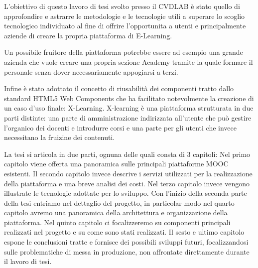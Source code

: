 L'obiettivo di questo lavoro di tesi svolto presso il CVDLAB è stato quello di approfondire e astrarre le metodologie e le tecnologie utili a superare lo scoglio tecnologico individuato al fine di offrire l'opportunita a utenti e principalmente aziende di creare la propria piattaforma di E-Learning.

Un possibile fruitore della piattaforma potrebbe essere ad esempio una grande azienda che vuole creare una propria sezione Academy tramite la quale formare il personale senza dover necessariamente appogiarsi a terzi. 

Infine è stato adottato il concetto di riusabilità dei componenti tratto dallo standard HTML5 Web Components che ha facilitato notevolmente la creazione di un caso d'uso finale: X-Learning.
X-learning è una piattaforma strutturata in due parti distinte: una parte di amministrazione indirizzata all'utente che può gestire l'organico dei docenti e introdurre corsi e una parte per gli utenti che invece necessitano la fruizine dei contenuti.

La tesi si articola in due parti, ognuna delle quali consta di 3 capitoli:
Nel primo capitolo viene offerta una panoramica sulle principali piattaforme MOOC esistenti.
Il secondo capitolo invece descrive i servizi utilizzati per la realizzazione della piattaforma e una breve analisi dei costi.
Nel terzo capitolo invece vengono illustrate le tecnologie adottate per lo sviluppo.
Con l'inizio della seconda parte della tesi entriamo nel dettaglio del progetto, in particolar modo nel quarto capitolo avremo una panoramica della architettura e organizzazione della piattaforma.
Nel quinto capitolo ci focalizzeremo su componenti principali realizzati nel progetto e su come sono stati realizzati.
Il sesto e ultimo capitolo espone le conclusioni tratte e fornisce dei possibili sviluppi futuri, focalizzandosi sulle problematiche di messa in produzione, non affrontate direttamente durante il lavoro di tesi.